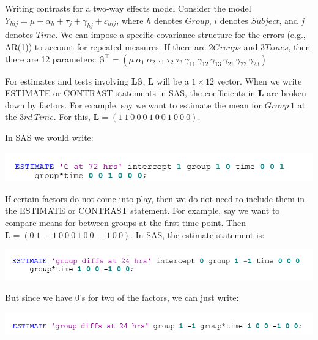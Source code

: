 \documentclass[
  9pt,
  ignorenonframetext,
]{beamer}
\begin{document}
\begin{frame}{Writing contrasts for a two-way effects model}
\protect\hypertarget{writing-contrasts-for-a-two-way-effects-model}{}
Consider the model
\(Y_{hij} = \mu + \alpha_h + \tau_j + \gamma_{hj} + ε_{hij}\), where
\(h\) denotes \(Group\), \(i\) denotes \(Subject\), and \(j\) denotes
\(Time\). We can impose a specific covariance structure for the errors
(e.g., AR(1)) to account for repeated measures. If there are
\(2 Groups\) and \(3 Times\), then there are 12 parameters:
\(\pmb \beta^{\top}=(\mu\ \alpha_1\ \alpha_2\ \tau_1\ \tau_2\ \tau_3\ \gamma_{11}\ \gamma_{12}\ \gamma_{13}\ \gamma_{21}\ \gamma_{22}\ \gamma_{23})\)

For estimates and tests involving \(\pmb {L\beta}\), \(\pmb L\) will be
a \(1 \times 12\) vector. When we write ESTIMATE or CONTRAST statements
in SAS, the coefficients in \(\pmb L\) are broken down by factors. For
example, say we want to estimate the mean for \(Group\ 1\) at the
\(3rd\ Time\). For this,
\(\pmb L=(1\ 1\ 0\ 0\ 0\ 1\ 0\ 0\ 1\ 0\ 0\ 0)\).

In SAS we would write:

\begin{center}\includegraphics[width=1\linewidth]{figs_L5/f1} \end{center}
\end{frame}

\begin{frame}{}
\protect\hypertarget{section-3}{}
If certain factors do not come into play, then we do not need to include
them in the ESTIMATE or CONTRAST statement. For example, say we want to
compare means for between groups at the first time point. Then
\(\pmb L=(0\ 1\ -1\ 0\ 0\ 0\ 1\ 0\ 0\ -1\ 0\ 0)\). In SAS, the estimate
statement is:

\begin{center}\includegraphics[width=1\linewidth]{figs_L5/f2} \end{center}

But since we have 0's for two of the factors, we can just write:

\begin{center}\includegraphics[width=1\linewidth]{figs_L5/f3} \end{center}
\end{frame}
\end{document}
